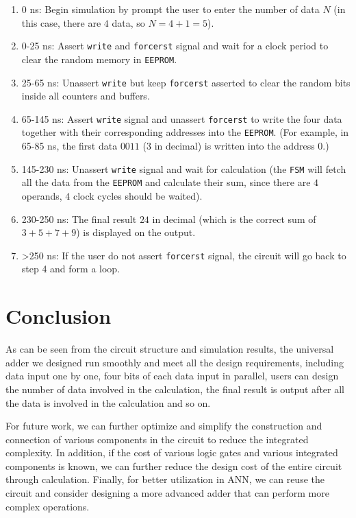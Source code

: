 \documentclass[11pt]{article}
\begin{document}
\begin{enumerate}
	\item 0 ns: Begin simulation by prompt the user to enter the number of data $N$ (in this case, there are $4$ data, so $N = 4+1 = 5$).
	\item 0-25 ns: Assert \texttt{write} and \texttt{forcerst} signal and wait for a clock period to clear the random memory in \texttt{EEPROM}.
	\item 25-65 ns: Unassert \texttt{write} but keep \texttt{forcerst} asserted to clear the random bits inside all counters and buffers.
	\item 65-145 ns: Assert \texttt{write} signal and unassert \texttt{forcerst} to write the four data together with their corresponding addresses into the \texttt{EEPROM}. (For example, in 65-85 ns, the first data $0011$ (3 in decimal) is written into the address 0.)
	\item 145-230 ns: Unassert \texttt{write} signal and wait for calculation (the \texttt{FSM} will fetch all the data from the \texttt{EEPROM} and calculate their sum, since there are $4$ operands, $4$ clock cycles should be waited).
	\item 230-250 ns: The final result $24$ in decimal (which is the correct sum of $3+5+7+9$) is displayed on the output.
	\item >250 ns: If the user do not assert \texttt{forcerst} signal, the circuit will go back to step 4 and form a loop.
\end{enumerate}

\section{Conclusion}

As can be seen from the circuit structure and simulation results, the universal adder we designed run smoothly and meet all the design requirements, including data input one by one, four bits of each data input in parallel, users can design the number of data involved in the calculation, the final result is output after all the data is involved in the calculation and so on.

For future work, we can further optimize and simplify the construction and connection of various components in the circuit to reduce the integrated complexity. In addition, if the cost of various logic gates and various integrated components is known, we can further reduce the design cost of the entire circuit through calculation. Finally, for better utilization in ANN, we can reuse the circuit and consider designing a more advanced adder that can perform more complex operations.
\end{document}
